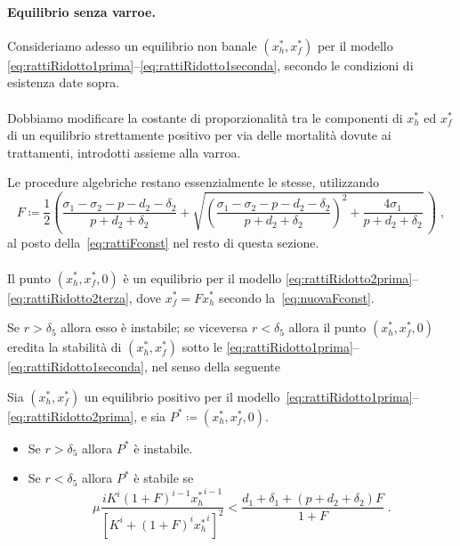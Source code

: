 \paragraph{Equilibrio senza varroe. } Consideriamo adesso un equilibrio non banale $(x_h^*, x_f^*)$ per il modello \eqref{eq:rattiRidotto1prima}--\eqref{eq:rattiRidotto1seconda}, secondo le condizioni di esistenza date sopra.

\paragraph{}
Dobbiamo modificare la costante di proporzionalità tra le componenti di $x_h^*$ ed $x_f^*$ di un equilibrio
strettamente positivo per via delle mortalità dovute ai trattamenti, introdotti assieme alla varroa.

Le procedure algebriche restano essenzialmente le stesse, utilizzando
\begin{equation}
F \coloneq \frac{1}{2} \left( \frac{ \sigma_1 - \sigma_2 - p - d_2 -\delta_2}{p+d_2+\delta_2} +
    \sqrt{ {\left( \frac{ \sigma_1 - \sigma_2 - p - d_2 -\delta_2 }{p+d_2+\delta_2} \right)}^2 + \frac{4 \sigma_1}{p+d_2+\delta_2} } \, \right) \; ,
    \label{eq:nuovaFconst}
\end{equation}
al posto della~\eqref{eq:rattiFconst} nel resto di questa sezione.

\paragraph{}
Il punto $(x_h^*, x_f^*, 0)$ è un equilibrio per il modello \eqref{eq:rattiRidotto2prima}--\eqref{eq:rattiRidotto2terza}, dove $x_f^* = F x_h^*$ secondo la~\eqref{eq:nuovaFconst}.

Se $r > \delta_5$ allora esso è instabile; se viceversa $r< \delta_5$ allora
il punto $(x_h^*, x_f^*, 0)$ eredita la stabilità di $(x_h^*, x_f^*)$ sotto le
\eqref{eq:rattiRidotto1prima}--\eqref{eq:rattiRidotto1seconda}, nel senso della seguente

\begin{proposizione}
    Sia $(x_h^*, x_f^*)$ un equilibrio positivo per
    il modello~\eqref{eq:rattiRidotto1prima}--\eqref{eq:rattiRidotto2prima}, e sia
    $P^* \coloneq (x_h^*, x_f^*, 0)$.
    \begin{itemize}
        \item Se $r > \delta_5 $ allora $P^*$ è instabile.
        \item Se $r < \delta_5 $ allora $P^*$ è stabile se
        \begin{equation}
            \mu \frac{ i K^i (1+F)^{i-1}{x_h^*}^{i-1} }{ {\left[ K^i +(1+F)^i {x_h^*}^i \right]}^2 }
            < \frac{d_1 + \delta_1 + (p+d_2+\delta_2)F}{1+F} \; .
            \label{eq:rattiRidotto2stability}
        \end{equation}
    \end{itemize}
\end{proposizione}


